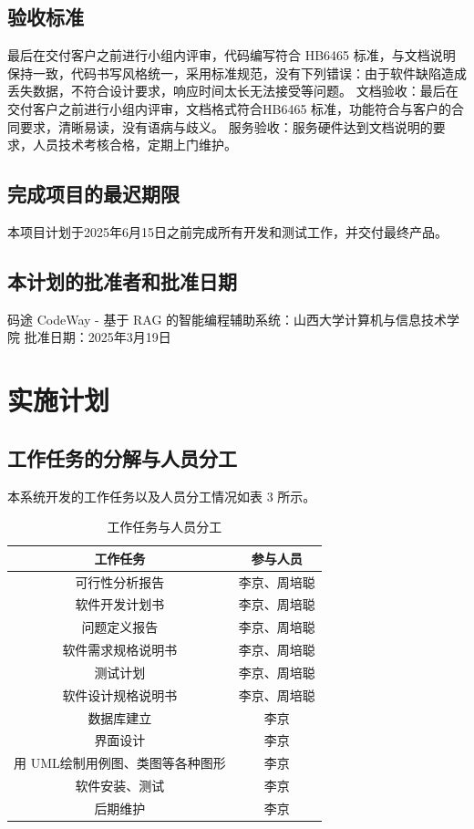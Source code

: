 \documentclass[
    report,     %
    oneside,    %
    UTF8,       %
    zihao=-4    %
]{config} %
\begin{document}
\subsection{验收标准}
最后在交付客户之前进行小组内评审，代码编写符合 HB6465 标准，与文档说明保持一致，代码书写风格统一，采用标准规范，没有下列错误：由于软件缺陷造成丢失数据，不符合设计要求，响应时间太长无法接受等问题。
文档验收：最后在交付客户之前进行小组内评审，文档格式符合HB6465 标准，功能符合与客户的合同要求，清晰易读，没有语病与歧义。
服务验收：服务硬件达到文档说明的要求，人员技术考核合格，定期上门维护。

\subsection{完成项目的最迟期限}
本项目计划于2025年6月15日之前完成所有开发和测试工作，并交付最终产品。
\subsection{本计划的批准者和批准日期}
码途 CodeWay - 基于 RAG 的智能编程辅助系统：山西大学计算机与信息技术学院
批准日期：2025年3月19日
\section{实施计划}
\subsection{工作任务的分解与人员分工}
本系统开发的工作任务以及人员分工情况如表 3 所示。
\begin{table}[H] %
    \centering %
    \caption{工作任务与人员分工} %
    \label{tab:task-participants} %
    \renewcommand\arraystretch{0.85} %
    \setlength{\tabcolsep}{12pt} %
    \begin{tabular}{cc} %
        \toprule[1.5pt] %
        \textbf{工作任务} & \textbf{参与人员} \\ %
        \midrule[0.8pt] %
        可行性分析报告 & 李京、周培聪\\ 
        软件开发计划书 & 李京、周培聪\\ 
        问题定义报告 & 李京、周培聪\\ 
        软件需求规格说明书 & 李京、周培聪\\ 
        测试计划 & 李京、周培聪\\ 
        软件设计规格说明书  & 李京、周培聪\\ 
        数据库建立  & 李京\\ 
        界面设计  & 李京\\ 
        用 UML绘制用例图、类图等各种图形  & 李京\\ 
        软件安装、测试 & 李京\\ 
        后期维护  & 李京\\ 
        \hline\hline %
    \end{tabular}
\end{table}
\end{document}
